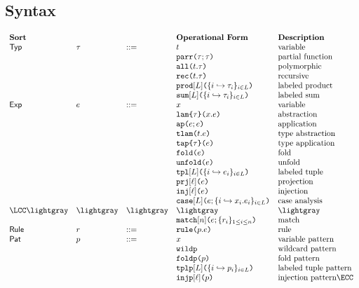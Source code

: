 \subsection{Syntax}
\[\begin{array}{lllllll}
\textbf{Sort} & & 
& \textbf{Operational Form} 
& \textbf{Description}\\
\mathsf{Typ} & \tau & ::= & t 
& \text{variable}\\
&&& \aparr{\tau}{\tau} 
& \text{partial function}\\
&&& \aall{t}{\tau} 
& \text{polymorphic}\\
&&& \arec{t}{\tau} 
& \text{recursive}\\
&&& \aprod{\labelset}{\mapschema{\tau}{i}{\labelset}} 
& \text{labeled product}\\
&&& \asum{\labelset}{\mapschema{\tau}{i}{\labelset}} 
& \text{labeled sum}\\
\mathsf{Exp} & e & ::= & x 
& \text{variable}\\
&&& \aelam{\tau}{x}{e} 
& \text{abstraction}\\
&&& \aeap{e}{e} 
& \text{application}\\
&&& \aetlam{t}{e} 
& \text{type abstraction}\\
&&& \aetap{e}{\tau} 
& \text{type application}\\
&&& \aefold{e} 
& \text{fold}\\
&&& \aeunfold{e} 
& \text{unfold}\\
&&& \aetpl{\labelset}{\mapschema{e}{i}{\labelset}} 
& \text{labeled tuple}\\
&&& \aepr{\ell}{e} 
& \text{projection}\\
&&& \aein{\ell}{e} 
& \text{injection}\\
&&& \aecase{\labelset}{e}{\mapschemab{x}{e}{i}{\labelset}} 
& \text{case analysis}\\
\LCC \lightgray & \lightgray & \lightgray 
& \lightgray & \lightgray \\
&&
& \aematchwith{n}{e}{\seqschemaX{r}}
& \text{match}\\
\mathsf{Rule} & r & ::= 
& \aematchrule{p}{e} 
& \text{rule}\\
\mathsf{Pat} & p & ::= 
& x  
& \text{variable pattern}\\
&&& \aewildp 
& \text{wildcard pattern}\\
&&& \aefoldp{p} 
& \text{fold pattern}\\
&&& \aetplp{\labelset}{\mapschema{p}{i}{\labelset}} 
& \text{labeled tuple pattern}\\
&&& \aeinjp{\ell}{p} 
& \text{injection pattern} \ECC
\end{array}\]
